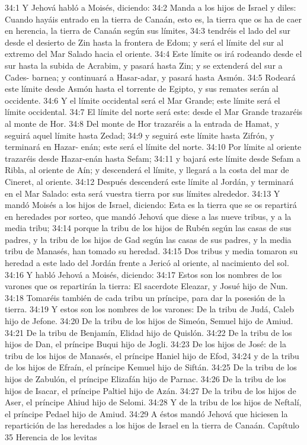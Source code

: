 34:1 Y Jehová habló a Moisés, diciendo:  
34:2 Manda a los hijos de Israel y diles: Cuando hayáis entrado en la tierra de Canaán, esto es, la tierra que os ha de caer en herencia, la tierra de Canaán según sus límites,  
34:3 tendréis el lado del sur desde el desierto de Zin hasta la frontera de Edom; y será el límite del sur al extremo del Mar Salado hacia el oriente.  
34:4 Este límite os irá rodeando desde el sur hasta la subida de Acrabim, y pasará hasta Zin; y se extenderá del sur a Cades- barnea; y continuará a Hasar-adar, y pasará hasta Asmón.  
34:5 Rodeará este límite desde Asmón hasta el torrente de Egipto, y sus remates serán al occidente.  
34:6 Y el límite occidental será el Mar Grande; este límite será el límite occidental. 
34:7 El límite del norte será este: desde el Mar Grande trazaréis al monte de Hor.  
34:8 Del monte de Hor trazaréis a la entrada de Hamat, y seguirá aquel límite hasta Zedad;  
34:9 y seguirá este límite hasta Zifrón, y terminará en Hazar- enán; este será el límite del norte. 
34:10 Por límite al oriente trazaréis desde Hazar-enán hasta Sefam;  
34:11 y bajará este límite desde Sefam a Ribla, al oriente de Aín; y descenderá el límite, y llegará a la costa del mar de Cineret, al oriente.  
34:12 Después descenderá este límite al Jordán, y terminará en el Mar Salado: esta será vuestra tierra por sus límites alrededor.  
34:13 Y mandó Moisés a los hijos de Israel, diciendo: Esta es la tierra que se os repartirá en heredades por sorteo, que mandó Jehová que diese a las nueve tribus, y a la media tribu;  
34:14 porque la tribu de los hijos de Rubén según las casas de sus padres, y la tribu de los hijos de Gad según las casas de sus padres, y la media tribu de Manasés, han tomado su heredad.  
34:15 Dos tribus y media tomaron su heredad a este lado del Jordán frente a Jericó al oriente, al nacimiento del sol.  
34:16 Y habló Jehová a Moisés, diciendo:  
34:17 Estos son los nombres de los varones que os repartirán la tierra: El sacerdote Eleazar, y Josué hijo de Nun.  
34:18 Tomaréis también de cada tribu un príncipe, para dar la posesión de la tierra.  
34:19 Y estos son los nombres de los varones: De la tribu de Judá, Caleb hijo de Jefone.  
34:20 De la tribu de los hijos de Simeón, Semuel hijo de Amiud.  
34:21 De la tribu de Benjamín, Elidad hijo de Quislón.  
34:22 De la tribu de los hijos de Dan, el príncipe Buqui hijo de Jogli.  
34:23 De los hijos de José: de la tribu de los hijos de Manasés, el príncipe Haniel hijo de Efod,  
34:24 y de la tribu de los hijos de Efraín, el príncipe Kemuel hijo de Siftán.  
34:25 De la tribu de los hijos de Zabulón, el príncipe Elizafán hijo de Parnac.  
34:26 De la tribu de los hijos de Isacar, el príncipe Paltiel hijo de Azán.  
34:27 De la tribu de los hijos de Aser, el príncipe Ahiud hijo de Selomi.  
34:28 Y de la tribu de los hijos de Neftalí, el príncipe Pedael hijo de Amiud. 
34:29 A éstos mandó Jehová que hiciesen la repartición de las heredades a los hijos de Israel en la tierra de Canaán.  
Capítulo 35
Herencia de los levitas  

